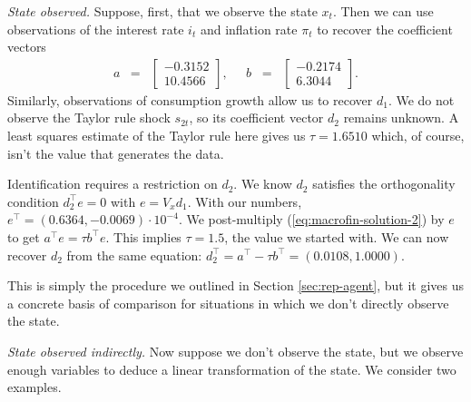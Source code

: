 \documentclass[11pt]{article}
\begin{document}
{{\it State observed.\/}
Suppose, first, that we observe the state $x_t$.
Then we can use observations of the interest rate $i_t$ and inflation rate $\pi_t$ to
recover the coefficient vectors
\begin{eqnarray*}
    a &=&
    \left[
        \begin{array}{r}
        -0.3152 \\ 10.4566
        \end{array}
    \right] ,
    \;\;\;\;\;
    b \;\;=\;\;
    \left[
        \begin{array}{r}
        -0.2174 \\ 6.3044
        \end{array}
    \right] .
\end{eqnarray*}
Similarly, observations of consumption growth allow us to recover $d_1$.
We do not observe the Taylor rule shock $s_{2t}$,
so its coefficient vector $d_2$ remains unknown.
A least squares estimate of the Taylor rule here gives us $\tau = 1.6510$
which, of course, isn't the value that generates the data.


Identification requires a restriction on $d_2$.
We know $d_2$ satisfies the
orthogonality condition $d_2^\top e = 0$ with $e = V_x d_1$.
With our numbers, $ e^\top = (0.6364, -0.0069 ) \cdot 10^{-4}$.
We post-multiply (\ref{eq:macrofin-solution-2}) by $e$ to get
$ a^\top e = \tau b^\top e $.
This implies $\tau = 1.5$, the value we started with.
We can now recover $d_2$ from the same equation:
$ d_2^\top = a^\top - \tau b^\top = (0.0108, 1.0000)$.

This is simply the procedure we outlined in
Section \ref{sec:rep-agent}, but it gives us a concrete
basis of comparison for situations in which we don't directly
observe the state.

{\it State observed indirectly.\/}
Now suppose we don't observe the state, but we observe enough variables
to deduce a linear transformation of the state.
We consider two examples.

}
\end{document}
